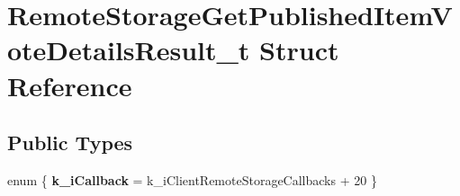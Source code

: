 \hypertarget{structRemoteStorageGetPublishedItemVoteDetailsResult__t}{}\section{Remote\+Storage\+Get\+Published\+Item\+Vote\+Details\+Result\+\_\+t Struct Reference}
\label{structRemoteStorageGetPublishedItemVoteDetailsResult__t}
\subsection*{Public Types}
\begin{DoxyCompactItemize}
\item 
\hypertarget{structRemoteStorageGetPublishedItemVoteDetailsResult__t_a0b7b184d4b1946e9d95b799eea6422bf}{}enum \{ {\bfseries k\+\_\+i\+Callback} = k\+\_\+i\+Client\+Remote\+Storage\+Callbacks + 20
 \}\label{structRemoteStorageGetPublishedItemVoteDetailsResult__t_a0b7b184d4b1946e9d95b799eea6422bf}

\end{DoxyCompactItemize}
